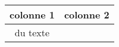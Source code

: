 \begin{longtable}{|c|c|}
	
	\hline \bf colonne 1 & \bf colonne 2 \\ 
	\hline
	\endfirsthead
	
	
	
	
	\hline 	du texte &	\\ 
	\hline

\end{longtable}